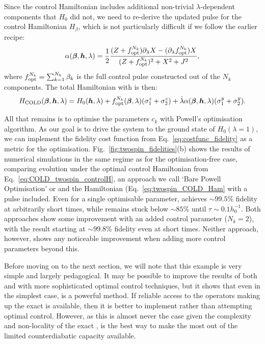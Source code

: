 Since the control Hamiltonian includes additional non-trivial $\lambda$-dependent components that $H_0$ did not, we need to re-derive the updated   pulse for the control Hamiltonian $H_{\beta}$, which is not particularly difficult if we follow the earlier recipe:
\begin{equation}\label{eq:twospin_alpha_COLD}
    \alpha(\boldsymbol{\beta}, \boldsymbol{h}, \lambda) = \frac{1}{2} \frac{(Z + f_{\rm opt}^{N_k}) \partial_{\lambda} X - (\partial_{\lambda} f_{\rm opt}^{N_k}) X}{(Z + f_{\rm opt}^{N_k})^2 + X^2 + J^2},
\end{equation}
where $f_{\rm opt}^{N_k} = \sum_{k=1}^{N_k} \beta_k$ is the full control pulse constructed out of the $N_k$ components. The total  Hamiltonian with   is then:
\begin{equation}\label{eq:twospin_COLD_Ham}
    H_{\rm COLD}(\boldsymbol{\beta}, \boldsymbol{h}, \lambda) = H_0(\boldsymbol{h}, \lambda) + f_{\rm opt}^{N_k}(\boldsymbol{\beta}, \lambda)(\sigma^z_1 + \sigma^z_2) + \dot{\lambda} \alpha(\boldsymbol{\beta}, \boldsymbol{h}, \lambda)(\sigma^y_1 + \sigma^y_2).
\end{equation}

All that remains is to optimise the parameters $c_k$ with Powell's optimisation algorithm. As our goal is to drive the system to the ground state of $H_0(\lambda = 1)$, we can implement the fidelity cost function from Eq.~\eqref{eq:costfunc_fidelity} as a metric for the optimisation. Fig.~\ref{fig:twospin_fidelities}(b) shows the results of numerical simulations in the same regime as for the optimisation-free case, comparing evolution under the optimal control Hamiltonian from Eq.~\eqref{eq:COLD_twospin_controlH}, an approach we call `Bare Powell Optimisation' or  and the  Hamiltonian (Eq.~\eqref{eq:twospin_COLD_Ham} with a   pulse included. Even for a single optimisable parameter,  achieves $\sim 99.5\%$ fidelity at arbitrarily short times, while  remains stuck below $\sim 85\%$ until $\tau \sim 0.1h_0^{-1}$. Both approaches show some improvement with an added control parameter ($N_k = 2$), with the  result starting at $\sim 99.8\%$ fidelity even at short times. Neither approach, however, shows any noticeable improvement when adding more control parameters beyond this. 

Before moving on to the next section, we will note that this example is very simple and largely pedagogical. It may be possible to improve the results of both  and  with more sophisticated optimal control techniques, but it shows that even in the simplest case,  is a powerful method. If reliable access to the operators making up the exact  is available, then it is better to implement  rather than attempting optimal control. However, as this is almost never the case given the complexity and non-locality of the exact ,  is the best way to make the most out of the limited counterdiabatic capacity available.

